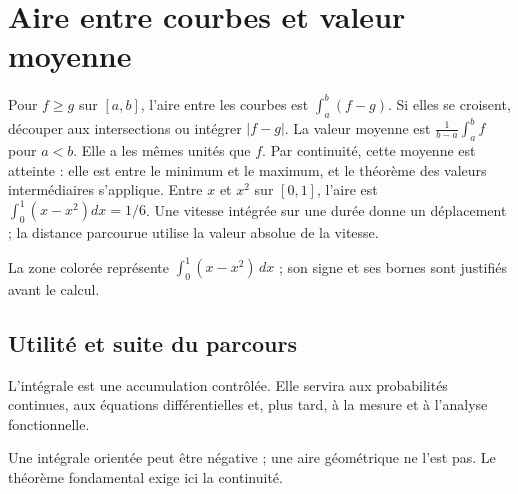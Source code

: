 \documentclass[../cours_tle.tex]{subfiles}
\begin{document}
\section{Aire entre courbes et valeur moyenne}
Pour $f\ge g$ sur $[a,b]$, l'aire entre les courbes est $\int_a^b(f-g)$. Si elles se croisent, découper aux intersections ou intégrer $|f-g|$.
La valeur moyenne est $\frac1{b-a}\int_a^bf$ pour $a<b$. Elle a les mêmes unités que $f$.
Par continuité, cette moyenne est atteinte : elle est entre le minimum et le maximum, et le théorème des valeurs intermédiaires s'applique.
Entre $x$ et $x^2$ sur $[0,1]$, l'aire est $\int_0^1(x-x^2)dx=1/6$.
Une vitesse intégrée sur une durée donne un déplacement ; la distance parcourue utilise la valeur absolue de la vitesse.
\begin{center}
\end{center}
La zone colorée représente $\int_0^1(x-x^2)\,dx$ ; son signe et ses bornes sont justifiés avant le calcul.
\begin{finchapitre}
\section{Utilité et suite du parcours}
L'intégrale est une accumulation contrôlée. Elle servira aux probabilités continues, aux équations différentielles et, plus tard, à la mesure et à l'analyse fonctionnelle.
\begin{retenir}
Une intégrale orientée peut être négative ; une aire géométrique ne l'est pas. Le théorème fondamental exige ici la continuité.
\end{retenir}
\end{finchapitre}
\end{document}
